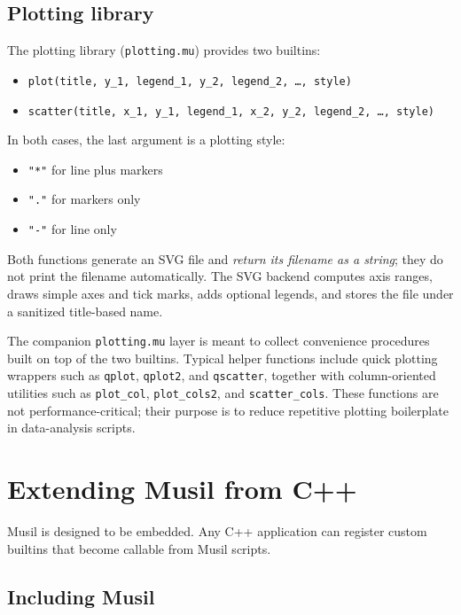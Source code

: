 \documentclass[11pt,a4paper]{article}
\newcommand{\musil}[1]{\lstinline[style=musilinline]{#1}}
\begin{document}
\subsection{Plotting library}

The plotting library (\musil{plotting.mu})  provides two builtins:
\begin{itemize}
    \item \texttt{plot(title, y\_1, legend\_1, y\_2, legend\_2, \dots, style)}
    \item \texttt{scatter(title, x\_1, y\_1, legend\_1, x\_2, y\_2, legend\_2, \dots, style)}
\end{itemize}
In both cases, the last argument is a plotting style:
\begin{itemize}
    \item \texttt{"*"} for line plus markers
    \item \texttt{"."} for markers only
    \item \texttt{"-"} for line only
\end{itemize}
Both functions generate an SVG file and \emph{return its filename as a string}; they do not print the filename automatically. The SVG backend computes axis ranges, draws simple axes and tick marks, adds optional legends, and stores the file under a sanitized title-based name. 

The companion \texttt{plotting.mu} layer is meant to collect convenience procedures built on top of the two builtins. Typical helper functions include quick plotting wrappers such as \texttt{qplot}, \texttt{qplot2}, and \texttt{qscatter}, together with column-oriented utilities such as \texttt{plot\_col}, \texttt{plot\_cols2}, and \texttt{scatter\_cols}. These functions are not performance-critical; their purpose is to reduce repetitive plotting boilerplate in data-analysis scripts.


\section{Extending Musil from C++}
\label{sec:extend}

Musil is designed to be embedded. Any C++ application can register custom
builtins that become callable from Musil scripts.

\subsection{Including Musil}
\end{document}
